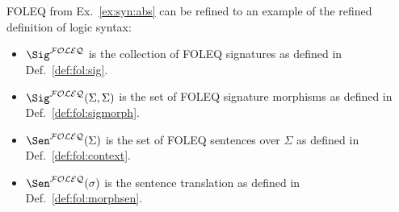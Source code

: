 \begin{example}\label{ex:syn:absmor}
FOLEQ from Ex.~\ref{ex:syn:abs} can be refined to an example of the refined definition of logic syntax:
  \begin{itemize}
   \item $\Sig^{\FOLEQ}$ is the collection of FOLEQ signatures as defined in Def.~\ref{def:fol:sig}.
   \item $\Sig^{\FOLEQ}(\Sigma,\Sigma)$ is the set of FOLEQ signature morphisms as defined in Def.~\ref{def:fol:sigmorph}.
   \item $\Sen^{\FOLEQ}(\Sigma)$ is the set of FOLEQ sentences over $\Sigma$ as defined in Def.~\ref{def:fol:context}.
   \item $\Sen^{\FOLEQ}(\sigma)$ is the sentence translation as defined in Def.~\ref{def:fol:morphsen}.
  \end{itemize}
\end{example}
\medskip

